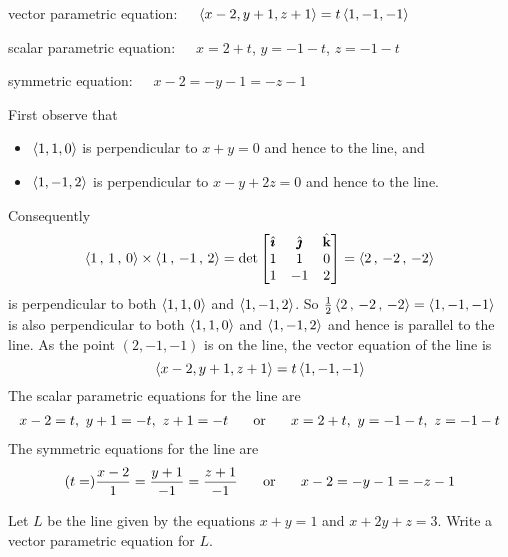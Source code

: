 \begin{answer}
vector parametric equation:\ \ \ $\left< x-2,y+1,z+1\right>= t\left< 1,-1,-1\right>$

scalar parametric equation:\ \ \ $x=2+t$,  $y=-1-t$,  $z=-1-t$

symmetric equation:\ \ \ $x-2=-y-1=-z-1$
\end{answer}

\begin{solution}
First observe that
\begin{itemize}
\item
$\left< 1,1,0\right>$ is perpendicular to $x+y=0$  and hence to the line, and
\item
$\left< 1,-1,2\right>$ is perpendicular to $x-y+2z=0$  and hence to the line.
\end{itemize}
Consequently
\begin{align*}
\left< 1\,,\,1\,,\,0\right> \times \left< 1\,,\,-1\,,\,2\right>
    =\det\left[\begin{matrix}
            \hat{\pmb{\imath}}  &  \hat{\pmb{\jmath}}  &  \hat{\mathbf{k}} \\
            1    &   1   &   0 \\
            1    &  -1   &   2 
            \end{matrix}\right]
=\left< 2 \,,\, -2 \,,\, -2 \right>
\end{align*}
is perpendicular to both $\left< 1,1,0\right>$ and $\left< 1,-1,2\right>$.
So $\frac{1}{2}\left< 2 \,,\, -2 \,,\, -2 \right>=\left< 1,-1,-1\right>\>$
is also perpendicular to both $\left< 1,1,0\right>$ and $\left< 1,-1,2\right>$
and hence is parallel to the line. As the point $(2,-1,-1)$ is on the line,
the vector  equation of the line is
\begin{equation*}
\left< x-2,y+1,z+1\right>= t\left< 1,-1,-1\right>
\end{equation*}
The scalar parametric equations for the line are
\begin{align*}
x-2=t,\ 
y+1=-t,\ 
z+1=-t
\hskip .25 in\hbox{or}\hskip .25 in
x=2+t,\ 
y=-1-t,\ 
z=-1-t
\end{align*}
The symmetric equations for the line are
\begin{align*}
(t=)\frac{x-2}{1}=\frac{y+1}{-1}=\frac{z+1}{-1}
\hskip .25 in\hbox{or}\hskip .25 in
x-2=-y-1=-z-1
\end{align*}


\end{solution}

\begin{question}[M200 2011A] %
Let  $L$ be the line given by the equations $x + y = 1$ and
$x + 2y + z = 3$.
Write a vector parametric equation for $L$.
\end{question}

